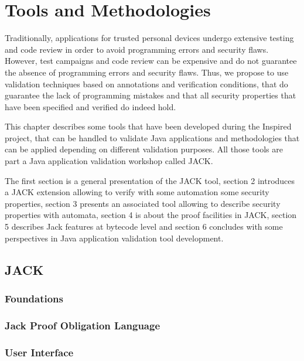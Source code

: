 \section{Tools and Methodologies}
Traditionally, applications for trusted personal devices undergo
extensive testing and code review in order to avoid programming 
errors and security flaws. However, test campaigns and code review
can be expensive and do not guarantee the absence of programming
errors and security flaws. Thus, we propose to use validation
techniques based on annotations and verification conditions,
that do guarantee the lack of programming mistakes and that
all security properties that have been specified and verified
do indeed hold.



This chapter describes some tools that have been developed during the
Inspired project, that can be handled to validate Java applications
and methodologies that can be applied depending on different
validation purposes.  All those tools are part a Java application
validation workshop called JACK.


The first section is a general presentation of the JACK tool, section
2 introduces a JACK extension allowing to verify with some automation
some security properties, section 3 presents an associated tool
allowing to describe security properties with automata, section 4 is
about the proof facilities in JACK, section 5 describes Jack features
at bytecode level and section 6 concludes with some perspectives in
Java application validation tool development.

\subsection{JACK}

\subsubsection{Foundations}

\subsubsection{Jack Proof Obligation Language}

\subsubsection{User Interface}

%
%

